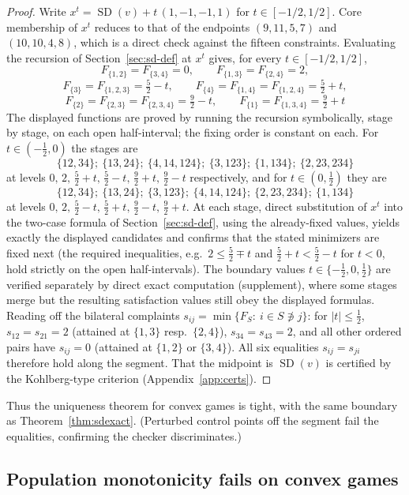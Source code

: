 \documentclass[11pt]{article}
\newcommand{\SD}{\operatorname{SD}}
\begin{document}
\begin{proof}
Write $x^t=\SD(v)+t\,(1,-1,-1,1)$ for $t\in[-1/2,1/2]$. Core membership of
$x^t$ reduces to that of the endpoints $(9,11,5,7)$ and $(10,10,4,8)$, which
is a direct check against the fifteen constraints. Evaluating the recursion
of Section~\ref{sec:sd-def} at $x^t$ gives, for every $t\in[-1/2,1/2]$,
\[
F_{\{1,2\}}=F_{\{3,4\}}=0,\qquad F_{\{1,3\}}=F_{\{2,4\}}=2,
\]
\[
F_{\{3\}}=F_{\{1,2,3\}}=\tfrac52-t,\qquad
F_{\{4\}}=F_{\{1,4\}}=F_{\{1,2,4\}}=\tfrac52+t,
\]
\[
F_{\{2\}}=F_{\{2,3\}}=F_{\{2,3,4\}}=\tfrac92-t,\qquad
F_{\{1\}}=F_{\{1,3,4\}}=\tfrac92+t
\]
The displayed functions are proved by running the recursion symbolically,
stage by stage, on each open half-interval; the fixing order is constant on
each. For $t\in(-\tfrac12,0)$ the stages are
\[
\{12,34\};\ \{13,24\};\ \{4,14,124\};\ \{3,123\};\ \{1,134\};\
\{2,23,234\}
\]
at levels $0,\,2,\,\tfrac52+t,\,\tfrac52-t,\,\tfrac92+t,\,\tfrac92-t$
respectively, and for $t\in(0,\tfrac12)$ they are
\[
\{12,34\};\ \{13,24\};\ \{3,123\};\ \{4,14,124\};\ \{2,23,234\};\
\{1,134\}
\]
at levels $0,\,2,\,\tfrac52-t,\,\tfrac52+t,\,\tfrac92-t,\,\tfrac92+t$. At
each stage, direct substitution of $x^t$ into the two-case formula of
Section~\ref{sec:sd-def}, using the already-fixed values, yields exactly the
displayed candidates and confirms that the stated minimizers are fixed next
(the required inequalities, e.g.\ $2\le\tfrac52\mp t$ and
$\tfrac52+t<\tfrac52-t$ for $t<0$, hold strictly on the open
half-intervals). The boundary values $t\in\{-\tfrac12,0,\tfrac12\}$ are
verified separately by direct exact computation (supplement), where some
stages merge but the resulting satisfaction values still obey the displayed
formulas. Reading off the bilateral complaints
$s_{ij}=\min\{F_S:\ i\in S\not\ni j\}$: for $|t|\le\tfrac12$,
$s_{12}=s_{21}=2$ (attained at $\{1,3\}$ resp.\ $\{2,4\}$),
$s_{34}=s_{43}=2$, and all other ordered pairs have $s_{ij}=0$ (attained at
$\{1,2\}$ or $\{3,4\}$). All six equalities $s_{ij}=s_{ji}$ therefore hold
along the segment. That the midpoint is $\SD(v)$ is certified by the
Kohlberg-type criterion (Appendix~\ref{app:certs}).
\end{proof}

Thus the uniqueness theorem for convex games is tight, with the same
boundary as Theorem~\ref{thm:sdexact}. (Perturbed control points off the
segment fail the equalities, confirming the checker discriminates.)

\subsection{Population monotonicity fails on convex games}
\end{document}
